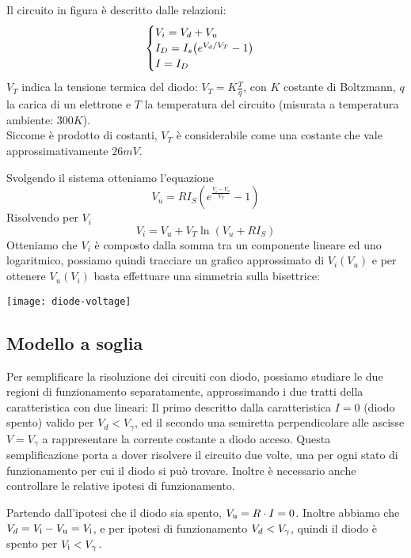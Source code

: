 \documentclass[../elettronica]{subfiles}
\begin{document}
Il circuito in figura è descritto dalle relazioni:
\[
    \begin{cases}
        V_i = V_d + V_u
        \\
        I_D = I_s \big(e^{V_d/V_T} -1\big)
        \\
        I = I_D
    \end{cases}
\]
$V_T$ indica la tensione termica del diodo: $V_T = K \frac{T}{q}$, con $K$ costante di Boltzmann, $q$ la carica di un elettrone e
$T$ la temperatura del circuito (misurata a temperatura ambiente: $300K$).
\\
Siccome è prodotto di costanti, $V_T$ è considerabile come una costante che vale approssimativamente $26mV$.

Svolgendo il sistema otteniamo l'equazione
\[
    V_u = R I_S (e^{\frac{V_i - V_u}{V_T}} -1)
\]
Risolvendo per $V_i$
\[
    V_i = V_u + V_T \ln(V_u + R I_S)
\]
Otteniamo che $V_i$ è composto dalla somma tra un componente lineare ed uno logaritmico, possiamo quindi tracciare un grafico approssimato di $V_i(V_u)$ e per ottenere $V_u(V_i)$ basta effettuare una simmetria sulla bisettrice:

\begin{center}
    \texttt{[image: diode-voltage]}
\end{center}

\subsection{Modello a soglia}
Per semplificare la risoluzione dei circuiti con diodo, possiamo studiare le due regioni di funzionamento separatamente, approssimando i due tratti della caratteristica con due lineari:
Il primo descritto dalla caratteristica $I = 0$ (diodo spento) valido per $V_d < V_\gamma$, ed il secondo una semiretta
perpendicolare alle ascisse $V = V_\gamma$ a rappresentare la corrente costante a diodo acceso.
Questa semplificazione porta a dover risolvere il circuito due volte, una per ogni stato di funzionamento per cui
il diodo si può trovare. Inoltre è necessario anche controllare le relative ipotesi di funzionamento.

Partendo dall'ipotesi che il diodo sia spento, $V_{\text{u}} = R \cdot I = 0$.
Inoltre abbiamo che $V_d = V_{\text{i}} - V_{\text{u}} = V_{\text{i}}$, e per ipotesi di funzionamento $V_d < V_\gamma$, quindi il diodo
è spento per $V_{\text{i}} < V_\gamma$.
\end{document}
